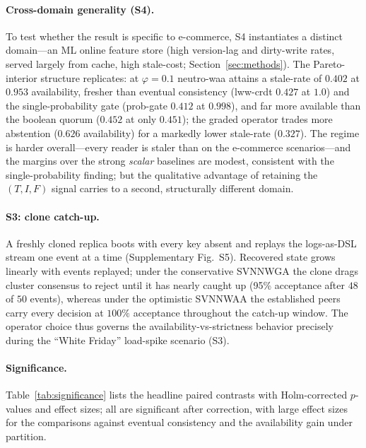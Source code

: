 \documentclass[11pt]{article}
\begin{document}
\paragraph{Cross-domain generality (S4).} To test whether the result is specific to e-commerce, S4
instantiates a distinct domain---an ML online feature store (high version-lag and dirty-write rates,
served largely from cache, high stale-cost; Section~\ref{sec:methods}). The Pareto-interior structure
replicates: at $\varphi=0.1$ neutro-waa attains a stale-rate of $0.402$ at $0.953$ availability, fresher
than eventual consistency (lww-crdt $0.427$ at $1.0$) and the single-probability gate (prob-gate $0.412$
at $0.998$), and far more available than the boolean quorum ($0.452$ at only $0.451$); the graded operator
trades more abstention ($0.626$ availability) for a markedly lower stale-rate ($0.327$). The regime is
harder overall---every reader is staler than on the e-commerce scenarios---and the margins over the strong
\emph{scalar} baselines are modest, consistent with the single-probability finding; but the qualitative
advantage of retaining the $(T,I,F)$ signal carries to a second, structurally different domain.

\paragraph{S3: clone catch-up.} A freshly cloned replica boots with every key absent and replays
the logs-as-DSL stream one event at a time (Supplementary Fig.~S5). Recovered state grows linearly
with events replayed; under the conservative SVNNWGA the clone drags cluster consensus to reject
until it has nearly caught up (95\% acceptance after $48$ of $50$ events), whereas under the
optimistic SVNNWAA the established peers carry every decision at $100\%$ acceptance throughout the
catch-up window. The operator choice thus governs the availability-vs-strictness behavior precisely
during the ``White Friday'' load-spike scenario (S3).

\paragraph{Significance.} Table~\ref{tab:significance} lists the headline paired contrasts with
Holm-corrected $p$-values and effect sizes; all are significant after correction, with large effect
sizes for the comparisons against eventual consistency and the availability gain under partition.


\end{document}

